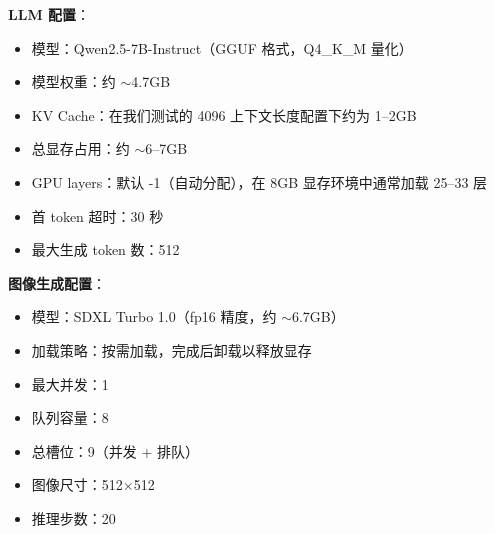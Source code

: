 \textbf{LLM 配置}：
\begin{itemize}
\item 模型：Qwen2.5-7B-Instruct（GGUF 格式，Q4\_K\_M 量化）
\item 模型权重：约 $\sim$4.7GB
\item KV Cache：在我们测试的 4096 上下文长度配置下约为 1--2GB
\item 总显存占用：约 $\sim$6--7GB
\item GPU layers：默认 -1（自动分配），在 8GB 显存环境中通常加载 25--33 层
\item 首 token 超时：30 秒
\item 最大生成 token 数：512
\end{itemize}

\textbf{图像生成配置}：
\begin{itemize}
\item 模型：SDXL Turbo 1.0（fp16 精度，约 $\sim$6.7GB）
\item 加载策略：按需加载，完成后卸载以释放显存
\item 最大并发：1
\item 队列容量：8
\item 总槽位：9（并发 + 排队）
\item 图像尺寸：512$\times$512
\item 推理步数：20
\end{itemize}